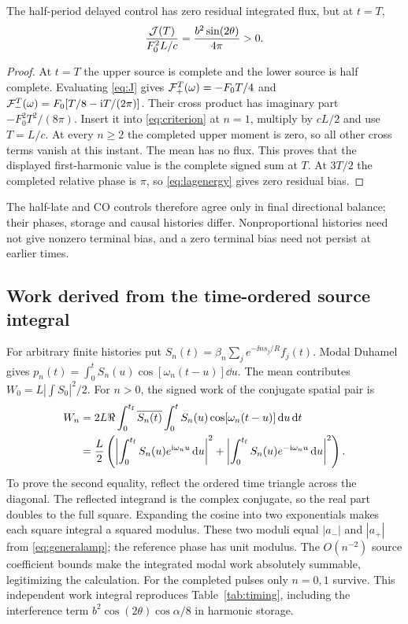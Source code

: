 \begin{proposition}\label{prop:halftime}
The half-period delayed control has zero residual integrated flux, but at $t=T$,
\begin{equation}\label{eq:halftransient}
 \frac{\mathcal J(T)}{F_0^2L/c}=\frac{b^2\sin(2\theta)}{4\pi}>0.
\end{equation}
\end{proposition}
\begin{proof}
At $t=T$ the upper source is complete and the lower source is half complete. Evaluating \eqref{eq:J} gives
$\mathcal F_+^T(\omega)=-F_0T/4$ and $\mathcal F_-^T(\omega)=F_0[T/8-\mathrm i T/(2\pi)]$.
Their cross product has imaginary part $-F_0^2T^2/(8\pi)$. Insert it into \eqref{eq:criterion} at $n=1$, multiply by $cL/2$ and use $T=L/c$. At every $n\ge2$ the completed upper moment is zero, so all other cross terms vanish at this instant. The mean has no flux. This proves that the displayed first-harmonic value is the complete signed sum at $T$. At $3T/2$ the completed relative phase is $\pi$, so \eqref{eq:lagenergy} gives zero residual bias.
\end{proof}

The half-late and CO controls therefore agree only in final directional balance; their phases, storage and causal histories differ. Nonproportional histories need not give nonzero terminal bias, and a zero terminal bias need not persist at earlier times.

\subsection{Work derived from the time-ordered source integral}\label{sec:timingwork}
For arbitrary finite histories put $S_n(t)=\beta_n\sum_j e^{-\ii ns_j/R}f_j(t)$. Modal Duhamel gives $p_n(t)=\int_0^tS_n(u)\cos[\omega_n(t-u)]\dd u$. The mean contributes $W_0=L|\int S_0|^2/2$. For $n>0$, the signed work of the conjugate spatial pair is
\begin{equation}\label{eq:generalwork}
 \begin{aligned}
 W_n&=2L\Re\int_0^{t_{\mathrm f}}\overline{S_n(t)}\int_0^tS_n(u)\cos[\omega_n(t-u)]\,\mathrm d u\,\mathrm d t\\
 &=\frac L2\left(\left|\int_0^{t_{\mathrm f}}S_n(u)e^{\mathrm i\omega_nu}\,\mathrm d u\right|^2
 +\left|\int_0^{t_{\mathrm f}}S_n(u)e^{-\mathrm i\omega_nu}\,\mathrm d u\right|^2\right).
 \end{aligned}
\end{equation}
To prove the second equality, reflect the ordered time triangle across the diagonal. The reflected integrand is the complex conjugate, so the real part doubles to the full square. Expanding the cosine into two exponentials makes each square integral a squared modulus. These two moduli equal $|a_-|$ and $|a_+|$ from \eqref{eq:generalamp}; the reference phase has unit modulus. The $O(n^{-2})$ source coefficient bounds make the integrated modal work absolutely summable, legitimizing the calculation. For the completed pulses only $n=0,1$ survive. This independent work integral reproduces Table~\ref{tab:timing}, including the interference term $b^2\cos(2\theta)\cos\alpha/8$ in harmonic storage.

